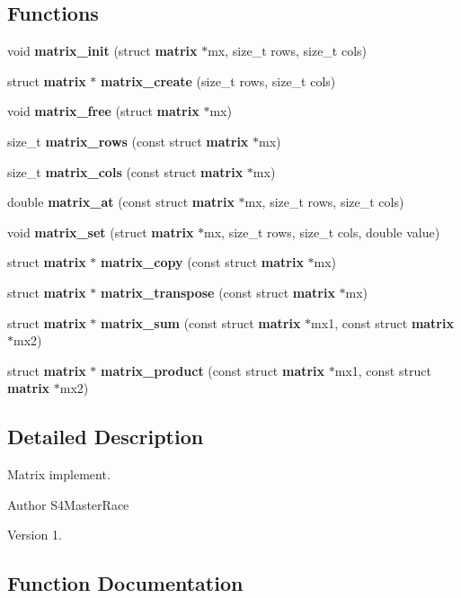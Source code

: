 \subsection*{Functions}
\begin{DoxyCompactItemize}
\item 
void \textbf{ matrix\+\_\+init} (struct \textbf{ matrix} $\ast$mx, size\+\_\+t rows, size\+\_\+t cols)
\item 
struct \textbf{ matrix} $\ast$ \textbf{ matrix\+\_\+create} (size\+\_\+t rows, size\+\_\+t cols)
\item 
void \textbf{ matrix\+\_\+free} (struct \textbf{ matrix} $\ast$mx)
\item 
size\+\_\+t \textbf{ matrix\+\_\+rows} (const struct \textbf{ matrix} $\ast$mx)
\item 
size\+\_\+t \textbf{ matrix\+\_\+cols} (const struct \textbf{ matrix} $\ast$mx)
\item 
double \textbf{ matrix\+\_\+at} (const struct \textbf{ matrix} $\ast$mx, size\+\_\+t rows, size\+\_\+t cols)
\item 
void \textbf{ matrix\+\_\+set} (struct \textbf{ matrix} $\ast$mx, size\+\_\+t rows, size\+\_\+t cols, double value)
\item 
struct \textbf{ matrix} $\ast$ \textbf{ matrix\+\_\+copy} (const struct \textbf{ matrix} $\ast$mx)
\item 
struct \textbf{ matrix} $\ast$ \textbf{ matrix\+\_\+transpose} (const struct \textbf{ matrix} $\ast$mx)
\item 
struct \textbf{ matrix} $\ast$ \textbf{ matrix\+\_\+sum} (const struct \textbf{ matrix} $\ast$mx1, const struct \textbf{ matrix} $\ast$mx2)
\item 
struct \textbf{ matrix} $\ast$ \textbf{ matrix\+\_\+product} (const struct \textbf{ matrix} $\ast$mx1, const struct \textbf{ matrix} $\ast$mx2)
\end{DoxyCompactItemize}


\subsection{Detailed Description}
Matrix implement. 

\begin{DoxyAuthor}{Author}
S4\+Master\+Race 
\end{DoxyAuthor}
\begin{DoxyVersion}{Version}
1. 
\end{DoxyVersion}


\subsection{Function Documentation}
\mbox{\label{matrix_8h_ace105cd24473b52d67874132e81dd55b}} 
